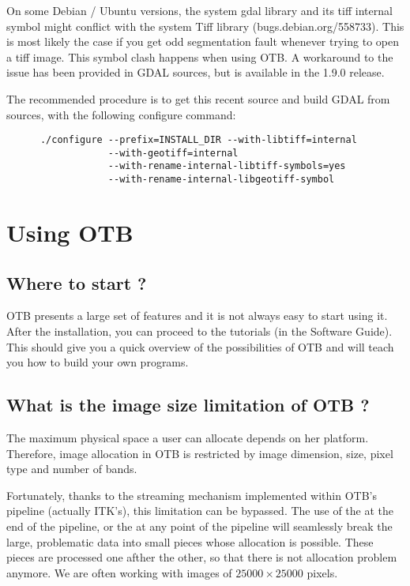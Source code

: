 On some Debian / Ubuntu versions, the system gdal library and its tiff internal symbol might conflict with the system Tiff library (bugs.debian.org/558733). This is most likely the case if you get odd segmentation fault whenever trying to open a tiff image. This symbol clash happens when using OTB. A workaround to the issue has been provided in GDAL sources, but is available in the 1.9.0 release.

The recommended procedure is to get this recent source and build GDAL from sources, with the following configure command:
  \begin{verbatim}
      ./configure --prefix=INSTALL_DIR --with-libtiff=internal
                  --with-geotiff=internal
                  --with-rename-internal-libtiff-symbols=yes
                  --with-rename-internal-libgeotiff-symbol
  \end{verbatim}


\section{Using OTB}

\subsection{Where to start ?}

OTB presents a large set of features and it is not always easy to start using it.
After the installation, you can proceed to the tutorials (in the Software Guide).
This should give you a quick overview of the possibilities of OTB and will teach
you how to build your own programs.

\subsection{What is the image size limitation of OTB ?}

The maximum physical space a user can allocate depends on her platform. Therefore,
image allocation in OTB is restricted by image dimension, size, pixel type and number
of bands.

Fortunately, thanks to the streaming mechanism implemented within
OTB's pipeline (actually ITK's), this limitation can be bypassed. The
use of the  at the end of the pipeline,
or the  at any point of the pipeline will
seamlessly break the large, problematic data into small pieces whose
allocation is possible. These pieces are processed one afther the
other, so that there is not allocation problem anymore. We are often working with
images of $25000 \times 25000$ pixels.


